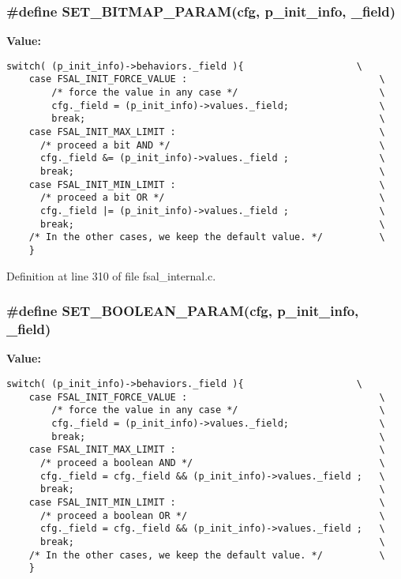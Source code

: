 \subsubsection{\setlength{\rightskip}{0pt plus 5cm}\#define SET\_\-BITMAP\_\-PARAM(cfg, p\_\-init\_\-info, \_\-field)}\label{fsal__internal_8c_a2}


{\bf Value:}

\footnotesize\begin{verbatim}switch( (p_init_info)->behaviors._field ){                    \
    case FSAL_INIT_FORCE_VALUE :                                  \
        /* force the value in any case */                         \
        cfg._field = (p_init_info)->values._field;                \
        break;                                                    \
    case FSAL_INIT_MAX_LIMIT :                                    \
      /* proceed a bit AND */                                     \
      cfg._field &= (p_init_info)->values._field ;                \
      break;                                                      \
    case FSAL_INIT_MIN_LIMIT :                                    \
      /* proceed a bit OR */                                      \
      cfg._field |= (p_init_info)->values._field ;                \
      break;                                                      \
    /* In the other cases, we keep the default value. */          \
    }
\end{verbatim}\normalsize 


Definition at line 310 of file fsal\_\-internal.c.
\subsubsection{\setlength{\rightskip}{0pt plus 5cm}\#define SET\_\-BOOLEAN\_\-PARAM(cfg, p\_\-init\_\-info, \_\-field)}\label{fsal__internal_8c_a3}


{\bf Value:}

\footnotesize\begin{verbatim}switch( (p_init_info)->behaviors._field ){                    \
    case FSAL_INIT_FORCE_VALUE :                                  \
        /* force the value in any case */                         \
        cfg._field = (p_init_info)->values._field;                \
        break;                                                    \
    case FSAL_INIT_MAX_LIMIT :                                    \
      /* proceed a boolean AND */                                 \
      cfg._field = cfg._field && (p_init_info)->values._field ;   \
      break;                                                      \
    case FSAL_INIT_MIN_LIMIT :                                    \
      /* proceed a boolean OR */                                  \
      cfg._field = cfg._field && (p_init_info)->values._field ;   \
      break;                                                      \
    /* In the other cases, we keep the default value. */          \
    }
\end{verbatim}\normalsize 


